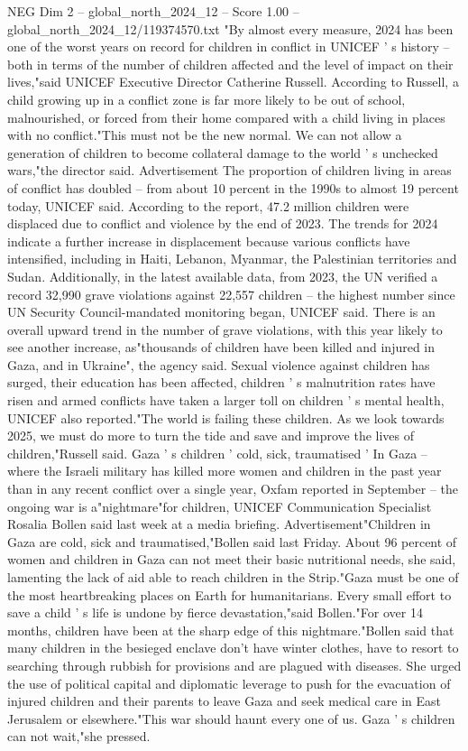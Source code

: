 \begin{textsample}{NEG Dim 2 – global\_north\_2024\_12 – Score 1.00 – global\_north\_2024\_12/119374570.txt}  \label{ex:f2_neg_171}
"By almost every measure, 2024 has been one of the worst years on record for children in conflict in UNICEF ' s history -- both in terms of the number of children affected and the level of impact on their lives,"said UNICEF Executive Director Catherine Russell.
According to Russell, a child growing up in a conflict zone is far more likely to be out of school, malnourished, or forced from their home compared with a child living in places with no conflict."This must not be the new normal.
We can not allow a generation of children to become collateral damage to the world ' s unchecked wars,"the director said.
Advertisement The proportion of children living in areas of conflict has doubled -- from about 10 percent in the 1990s to almost 19 percent today, UNICEF said.
According to the report, 47.2 million children were displaced due to conflict and violence by the end of 2023.
The trends for 2024 indicate a further increase in displacement because various conflicts have intensified, including in Haiti, Lebanon, Myanmar, the Palestinian territories and Sudan.
Additionally, in the latest available data, from 2023, the UN verified a record 32,990 grave violations against 22,557 children -- the highest number since UN Security Council-mandated monitoring began, UNICEF said.
There is an overall upward trend in the number of grave violations, with this year likely to see another increase, as"thousands of children have been killed and injured in Gaza, and in Ukraine", the agency said.
Sexual violence against children has surged, their education has been affected, children ' s malnutrition rates have risen and armed conflicts have taken a larger toll on children ' s mental health, UNICEF also reported."The world is failing these children.
As we look towards 2025, we must do more to turn the tide and save and improve the lives of children,"Russell said.
Gaza ' s children ' cold, sick, traumatised ' In Gaza -- where the Israeli military has killed more women and children in the past year than in any recent conflict over a single year, Oxfam reported in September -- the ongoing war is a"nightmare"for children, UNICEF Communication Specialist Rosalia Bollen said last week at a media briefing.
Advertisement"Children in Gaza are cold, sick and traumatised,"Bollen said last Friday.
About 96 percent of women and children in Gaza can not meet their basic nutritional needs, she said, lamenting the lack of aid able to reach children in the Strip."Gaza must be one of the most heartbreaking places on Earth for humanitarians.
Every small effort to save a child ' s life is undone by fierce devastation,"said Bollen."For over 14 months, children have been at the sharp edge of this nightmare."Bollen said that many children in the besieged enclave don't have winter clothes, have to resort to searching through rubbish for provisions and are plagued with diseases.
She urged the use of political capital and diplomatic leverage to push for the evacuation of injured children and their parents to leave Gaza and seek medical care in East Jerusalem or elsewhere."This war should haunt every one of us.
Gaza ' s children can not wait,"she pressed.

\end{textsample}
